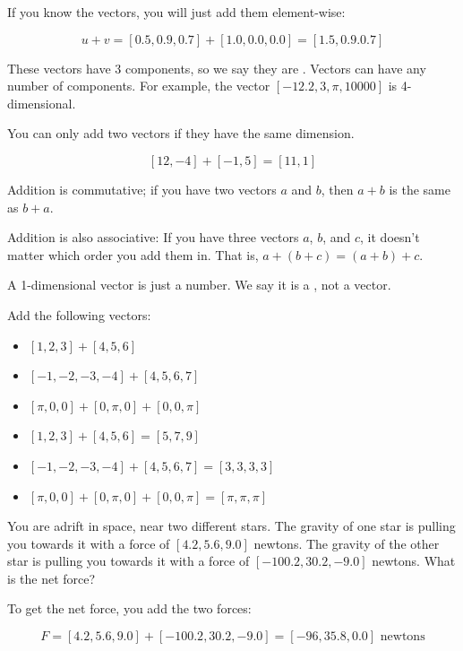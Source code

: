 If you know the vectors, you will just add them element-wise:

$$ u + v = [0.5, 0.9, 0.7] + [1.0, 0.0, 0.0] = [1.5, 0.9. 0.7] $$

These vectors have 3 components, so we say they are . 
Vectors can have any number of components. For example, the vector
 $[-12.2, 3, \pi, 10000]$ is 4-dimensional.

 You can only add two vectors if they have the same dimension.

 $$ [12, -4] + [-1, 5] = [11,1] $$

 Addition is commutative; if you have two vectors $a$ and $b$, then
 $a + b$ is the same as $b + a$.

 Addition is also associative: If you have three vectors $a$, $b$, and $c$,
 it doesn't matter which order you add them in. 
 That is, $a + (b + c) = (a + b) + c$.

 A 1-dimensional vector is just a number. We say it is a 
 , not a vector.

 \begin{Exercise}[title={Adding vectors}, label=adding_vectors]
Add the following vectors:
\begin{itemize}
    \item $[1, 2, 3] + [4, 5, 6]$
    \item $[-1, -2, -3, -4] + [4, 5, 6, 7]$
    \item $[\pi, 0, 0] + [0, \pi, 0] + [0, 0, \pi]$
\end{itemize}
\end{Exercise}
\begin{Answer}[ref=adding_vectors]
    \begin{itemize}
        \item $[1, 2, 3] + [4, 5, 6] = [5, 7, 9]$
        \item $[-1, -2, -3, -4] + [4, 5, 6, 7] = [3, 3, 3, 3]$
        \item $[\pi, 0, 0] + [0, \pi, 0] + [0, 0, \pi] = [\pi, \pi, \pi]$ 
    \end{itemize}
\end{Answer}

    \begin{Exercise}[title={Adding Forces}, label=adding_forces]
        You are adrift in space, near two different stars. 
        The gravity of one star is pulling you towards it with a 
        force of $[4.2, 5.6, 9.0]$ newtons.
        The gravity of the other star is pulling you towards it with
        a force of $[-100.2, 30.2, -9.0]$ newtons. What is the net force?
        \end{Exercise}
        \begin{Answer}[ref=adding_forces]
            To get the net force, you add the two forces:

            $$F = [4.2, 5.6, 9.0] + [-100.2, 30.2, -9.0] = [-96, 35.8, 0.0] 
            \text{ newtons}$$
   
\end{Answer}

